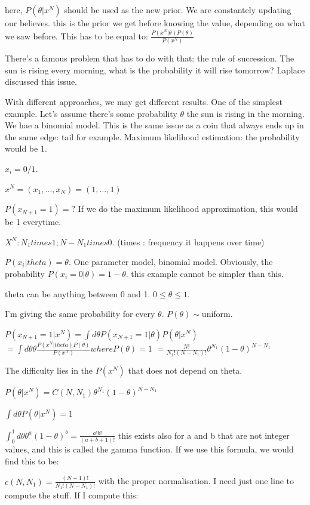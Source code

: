 \documentclass[a4paper]{tufte-book}
\begin{document}
here, $P(\theta |x^N)$ should be used as the new prior. We are constantely updating our believes. this is the prior we get before knowing the
value,
depending on what we saw before. This has to be equal to:
$\frac{P(x^N|\theta)P(\theta)}{P(x^N)}$

There's a famous problem that has to do with that: the rule of succession.
The sun is rising every morning, what is the probability it will rise tomorrow?
Laplace discussed this issue.

With different approaches, we may get different results. One of the simplest
example.
Let's assume there's some probability $\theta$ the sun is rising in the morning.
We hae a binomial model. This is the same issue as a coin that always ends up
in the same edge: tail for example.
Maximum likelihood estimation: the probability would be 1.

$x_i = 0/1.$

$x^N = (x_1, \ldots ,x_N) = (1,\ldots,1)$

$P(x_{N+1} = 1) = ?$
If we do the maximum likelihood approximation, this would be 1 everytime.

$X^N : N_1 times 1 ; N-N_1 times 0.$ (times : frequency it happens over time)

$P(x_i|theta) = \theta$. One parameter model, binomial model.
Obviously, the probability $P(x_i=0|\theta) = 1 - \theta$. this example cannot be
simpler than this.


theta can be anything between 0 and 1. $0 \leq \theta \leq 1$.

I'm giving the same probability for every $\theta$. $P(\theta) \sim $uniform.

$P(x_{N+1} =1|x^N) = \int d\theta P(x_{N+1}=1|\theta) P(\theta|x^N)$
$= \int d\theta \theta \frac{P(x^N|theta)P(\theta)}{P(x^N)} where P(\theta) = 1$
$= \frac{N!}{N_1!(N-N_1)!} \theta^{N_1} (1-\theta)^{N-N_1}$

The difficulty lies in the $P(x^N)$ that does not depend on theta.

$P(\theta|x^N)=C(N,N_1) \theta^{N_1} (1-\theta)^{N-N_1}$

$\int d\theta P(\theta|x^N) = 1$

$\int_0^1 d\theta \theta^a (1-\theta)^b = \frac{a!b!}{(a+b+1)!}$
this exists also for a and b that are not integer values, and this is called the
gamma function.
If we use this formula, we would find this to be:

$c(N,N_1) = \frac{(N+1)!}{N_1!(N-N_1)!}$
with the proper normalisation.
I need just one line to compute the stuff.
If I compute this:
\end{document}
